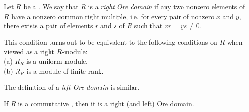 \documentclass[12pt]{article}
\begin{document}
Let $R$ be a .  
We say that $R$ is a {\it right Ore domain} 
if any two nonzero elements of $R$ 
have a nonzero common right multiple, 
i.e. for every pair of nonzero $x$ and $y$, 
there exists a pair of elements $r$ and $s$ of $R$ 
such that $xr = ys \neq 0$.\par
This condition turns out to be equivalent 
to the following conditions on $R$ when viewed as a right $R$-module:\\
(a) $R_R$ is a uniform module.\\
(b) $R_R$ is a module of finite rank.\par
The definition of a {\it left Ore domain} is similar.\par
If $R$ is a commutative , 
then it is a right (and left) Ore domain.
\end{document}
